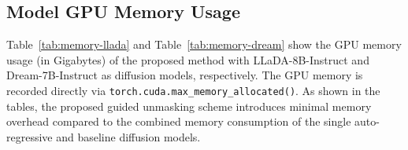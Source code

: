 \subsection{Model GPU Memory Usage}\label{sec:memory}

Table~\ref{tab:memory-llada} and Table~\ref{tab:memory-dream} show the GPU memory usage (in Gigabytes) of the proposed method with LLaDA-8B-Instruct and Dream-7B-Instruct as diffusion models, respectively.
The GPU memory is recorded directly via \texttt{torch.cuda.max\_memory\_allocated()}. As shown in the tables, the proposed guided unmasking scheme introduces minimal memory overhead compared to the combined memory consumption of the single auto-regressive and baseline diffusion models.

\begin{minipage}{0.45\linewidth}
\centering
{}
\label{tab:memory-llada}
\end{minipage}
\hfill
\begin{minipage}{0.45\linewidth}
\centering
{}
\label{tab:memory-dream}
\end{minipage}



